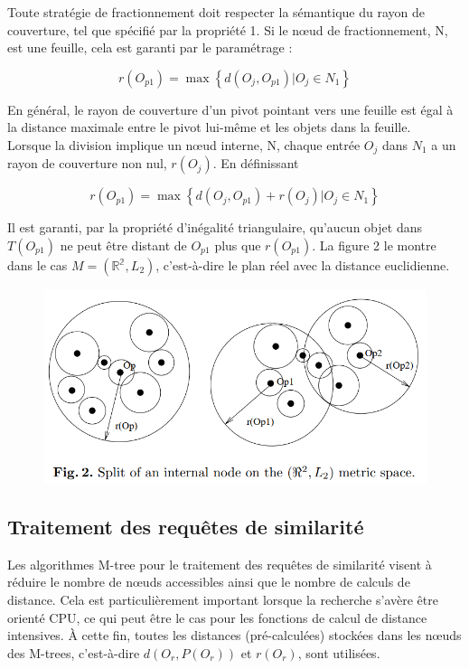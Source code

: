 Toute stratégie de fractionnement doit respecter la sémantique du rayon de couverture, tel que spécifié par la propriété 1. Si le nœud de fractionnement, N, est une feuille, cela est garanti par le paramétrage :

\begin{equation}
	r(O_{p1}) = \max \left\{d(O_j, O_{p1}) | O_j \in N_1 \right\}
\end{equation}

En général, le rayon de couverture d'un pivot pointant vers une feuille est égal à la distance maximale entre le pivot lui-même et les objets dans la feuille.\\

Lorsque la division implique un nœud interne, N, chaque entrée $ O_j $ dans $ N_1 $ a un rayon de couverture non nul, $ r(O_j) $. En définissant

\begin{equation}
r(O_{p1}) = \max \left\{d(O_j, O_{p1}) + r(O_j) | O_j \in N_1 \right\}
\end{equation}

Il est garanti, par la propriété d'inégalité triangulaire, qu'aucun objet dans $ T(O_{p1}) $ ne peut être distant de $  O_{p1} $ plus que $ r(O_{p1}) $. La figure 2 le montre dans le cas $ M = ( \mathbb{R^2}, L_2) $, c'est-à-dire le plan réel avec la distance euclidienne.
\begin{figure}[H]
	\centering
	\includegraphics[width=.6 \textwidth]{Figures/splitexep.png} %
\end{figure} 

\subsection{Traitement des requêtes de similarité}
Les algorithmes M-tree pour le traitement des requêtes de similarité visent à réduire le nombre de nœuds accessibles ainsi que le nombre de calculs de distance. Cela est particulièrement important lorsque la recherche s'avère être orienté CPU, ce qui peut être le cas pour les fonctions de calcul de distance intensives. À cette fin, toutes les distances (pré-calculées) stockées dans les nœuds des M-trees, c'est-à-dire $ d(O_r, P(O_r)) $ et $ r(O_r) $, sont utilisées.

